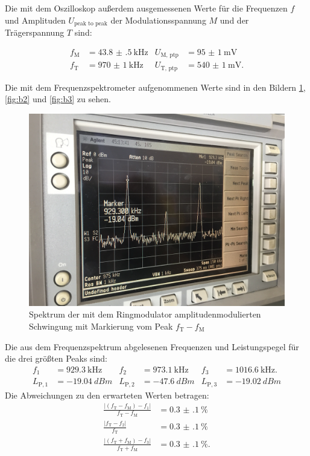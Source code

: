 Die mit dem Oszilloskop außerdem ausgemessenen Werte für die Frequenzen $f$ und Amplituden $U_\text{peak to peak}$ der Modulationsspannung $M$ und der Trägerspannung $T$ sind:

\begin{align*}
  f_\text{M} &= \SI{43.8(5)}{\kilo\hertz} & U_\text{M, ptp} &= \SI{95(1)}{\milli\volt}\\
  f_\text{T} &= \SI{970(1)}{\kilo\hertz} & U_\text{T, ptp} &= \SI{540(1)}{\milli\volt}.
\end{align*}

Die mit dem Frequenzspektrometer aufgenommenen Werte sind in den Bildern \ref{fig:b1}, \ref{fig:b2} und \ref{fig:b3} zu sehen.

\begin{figure}[h]
  \includegraphics[width=.9\textwidth]{Spektrum_Pics/b1.jpg}
  \caption{Spektrum der mit dem Ringmodulator amplitudenmodulierten Schwingung mit Markierung vom Peak $f_\text{T} - f_\text{M}$}
  \label{fig:b1}
\end{figure}


Die aus dem Frequenzspektrum abgelesenen Frequenzen und Leistungspegel für die drei größten Peaks sind:
\begin{align*}
  f_1 &= \SI{929.3}{\kilo\hertz} & f_2 &= \SI{973.1}{\kilo\hertz} & f_3 &= \SI{1016.6}{\kilo\hertz}.\\
  L_{\text{P}, 1} &= \SI{-19.04}{dBm} & L_{\text{P}, 2} &= \SI{-47.6}{dBm} & L_{\text{P}, 3} &= \SI{-19.02}{dBm}
\end{align*}
Die Abweichungen zu den erwarteten Werten betragen:
\begin{align*}
  \frac{|(f_\text{T} - f_\text{M}) - f_1|}{f_\text{T} - f_\text{M}} &= \SI{0.3(1)}{\percent}\\
  \frac{|f_\text{T} - f_2|}{f_\text{T}} &= \SI{0.3(1)}{\percent}\\
  \frac{|(f_\text{T} + f_\text{M}) - f_3|}{f_\text{T} + f_\text{M}} &= \SI{0.3(1)}{\percent}.
\end{align*}

